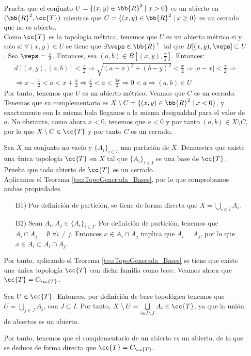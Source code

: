 \begin{ejercicio}
    Prueba que el conjunto $U=\{(x,y)\in \bb{R}^2\mid x>0\}$ es un abierto en $(\bb{R}^2, \cc{T})$ mientras que $C=\{(x,y)\in \bb{R}^2\mid x\geq 0\}$ es un cerrado que no es abierto.\\

    Como $\cc{T}$ es la topología métrica, tenemos que $U$ es un abierto métrico si y solo si $\forall (x,y)\in U$ se tiene que $\exists \veps\in \bb{R}^+$ tal que $B[(x,y),\veps]\subset U$. Sea $\veps=\frac{x}{2}$. Entonces, sea $(a,b)\in B\left[(x,y),\frac{x}{2}\right]$. Entonces:
    \begin{multline*}
        d[(x,y),(a,b)]<\frac{x}{2}\Longrightarrow \sqrt{(a-x)^2 + (b-y)^2} < \frac{x}{2} \Longrightarrow |a-x| < \frac{x}{2} \Longrightarrow \\ \Longrightarrow x-\frac{x}{2} < a < x+\frac{x}{2} \Longrightarrow \frac{x}{2} < a < \frac{3x}{2} \Longrightarrow 0<a \Longrightarrow (a,b)\in U
    \end{multline*}
    Por tanto, tenemos que $U$ es un abierto métrico. Veamos que $C$ es un cerrado. Tenemos que su complementario es $X\setminus C = \{(x,y)\in \bb{R}^2\mid x< 0\}$, y exactamente con la misma bola llegamos a la misma desigualdad para el valor de $a$. No obstante, como ahora $x<0$, tenemos que $a<0$ y por tanto $(a,b)\in X\setminus C$, por lo que $X\setminus C\in \cc{T}$ y por tanto $C$ es un cerrado.
\end{ejercicio}


\begin{ejercicio}
    Sea $X$ un conjunto no vacío y $\{A_i\}_{i\in I}$ una partición de $X$. Demuestra que existe una única topología $\cc{T}$ en $X$ tal que $\{A_i\}_{i\in I}$ es una base de $\cc{T}$. Prueba que todo abierto de $\cc{T}$ es un cerrado.\\

    Aplicamos el Teorema \ref{teo:TopoGenerada_Bases}, por lo que comprobamos ambas propiedades.
    \begin{enumerate}
        \item[B1)] Por definición de partición, se tiene de forma directa que $X=\bigcup\limits_{i\in I}A_i$.
        \item[B2)] Sean $A_i,A_j\in \{A_i\}_{i\in I}$. Por definición de partición, tenemos que $A_i\cap A_j=\emptyset$ $\forall i\neq j$. Entonces $x\in A_i\cap A_j$ implica que $A_i=A_j$, por lo que $x\in A_i\subset A_i\cap A_j$.
    \end{enumerate}
    Por tanto, aplicando el Teorema \ref{teo:TopoGenerada_Bases} se tiene que existe una única topología $\cc{T}$ con dicha familia como base. Veamos ahora que $\cc{T}=C_\cc{T}$.
    
    Sea $U\in \cc{T}$. Entonces, por definición de base topológica tenemos que $U=\bigcup\limits_{j\in J}A_j$, con $J\subset I$. Por tanto, $X\setminus U = \bigcup\limits_{i\in I\setminus J}A_i\in \cc{T}$, ya que la unión de abiertos es un abierto.

    Por tanto, tenemos que el complementario de un abierto es un abierto, de lo que se deduce de forma directa que $\cc{T}=C_\cc{T}$.
\end{ejercicio}

